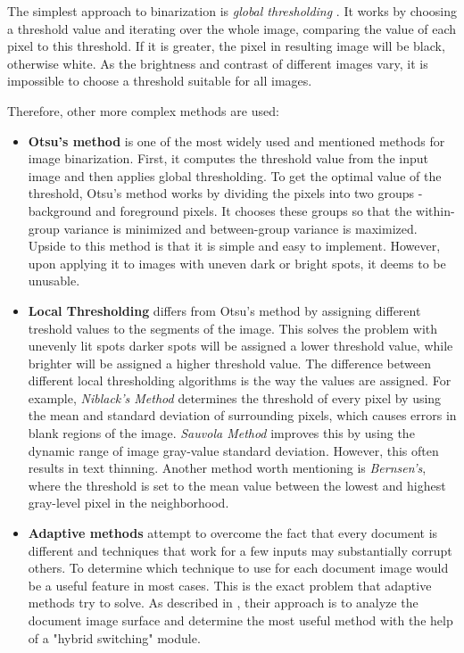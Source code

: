 The simplest approach to binarization is \emph{global thresholding} \citep{globalThresh}. It works by choosing a threshold value and iterating over the whole image, comparing the value of each pixel to this threshold. If it is greater, the pixel in resulting image will be black, otherwise white. As the brightness and contrast of different images vary, it is impossible to choose a threshold suitable for all images.

Therefore, other more complex methods are used:

\begin{itemize}
\item\textbf{Otsu's method} \citep{otsu} is one of the most widely used and mentioned methods for image binarization. First, it computes the threshold value from the input image and then applies global thresholding. To get the optimal value of the threshold, Otsu's method works by dividing the pixels into two groups - background and foreground pixels. It chooses these groups so that the within-group variance is minimized and between-group variance is maximized. Upside to this method is that it is simple and easy to implement. However, upon applying it to images with uneven dark or bright spots, it deems to be unusable.

\item\textbf{Local Thresholding}\citep{localOtherBin} differs from Otsu's method by assigning different treshold values to the segments of the image. This solves the problem with unevenly lit spots \xxx{-} darker spots will be assigned a lower threshold value, while brighter will be assigned a higher threshold value. The difference between different local thresholding algorithms is the way the values are assigned. For example, \emph{Niblack's Method}  determines the threshold of every pixel by using the mean and standard deviation of surrounding pixels, which causes errors in blank regions of the image. \emph{Sauvola Method} improves this by using the dynamic range of image gray-value standard deviation. However, this often results in text thinning. Another method worth mentioning is \emph{Bernsen's}, where the threshold is set to the mean value between the lowest and highest gray-level pixel in the neighborhood.

\item\textbf{Adaptive methods} attempt to overcome the fact that every document is different and techniques that work for a few inputs may substantially corrupt others.  To determine which technique to use for each document image would be a useful feature in most cases. This is the exact problem that adaptive methods try to solve. As described in \citep{adaptiveBin}, their approach is to analyze the document image surface and determine the most useful method with the help of a "hybrid switching" module.

\end{itemize}

